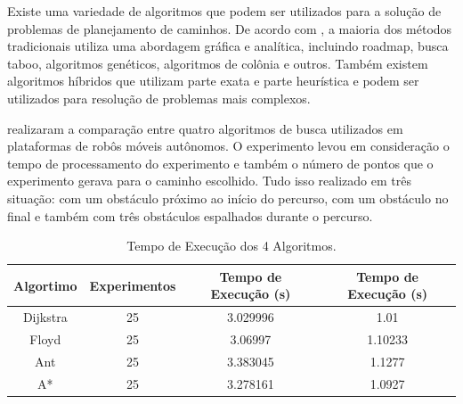 \par
Existe uma variedade de algoritmos que podem ser utilizados para a solução de problemas de planejamento de caminhos. De acordo com , a maioria dos métodos tradicionais utiliza uma abordagem gráfica e analítica, incluindo roadmap, busca taboo, algoritmos genéticos, algoritmos de colônia e outros. Também existem algoritmos híbridos que utilizam parte exata e parte heurística e podem ser utilizados para resolução de problemas mais complexos.
\cite{koubaa2018robot}
\par
{} realizaram a comparação entre quatro algoritmos de busca utilizados em plataformas de robôs móveis autônomos. O experimento levou em consideração o tempo de processamento do experimento e também o número de pontos que o experimento gerava para o caminho escolhido. Tudo isso realizado em três situação: com um obstáculo próximo ao início do percurso, com um obstáculo no final e também com três obstáculos espalhados durante o percurso.
\begin{table}[h!]
        \centering
        \caption{Tempo de Execução dos 4 Algoritmos. \cite{he2017comparison}}
        \begin{tabular}{| c | c | c | c |}
        \hline
        \textbf{Algortimo} & \textbf{Experimentos} & \textbf{Tempo de Execução (s)} & \textbf{Tempo de Execução (s)} \\
        \hline
            Dijkstra & 25 & 3.029996 & 1.01 \\
            \hline
            Floyd & 25 & 3.06997 & 1.10233 \\
            \hline
            Ant & 25 & 3.383045 & 1.1277 \\
            \hline
            A* & 25 &  3.278161 & 1.0927 \\
        \hline
        \end{tabular}
        \label{tab:pathplanning_algo4}
    \end{table}

